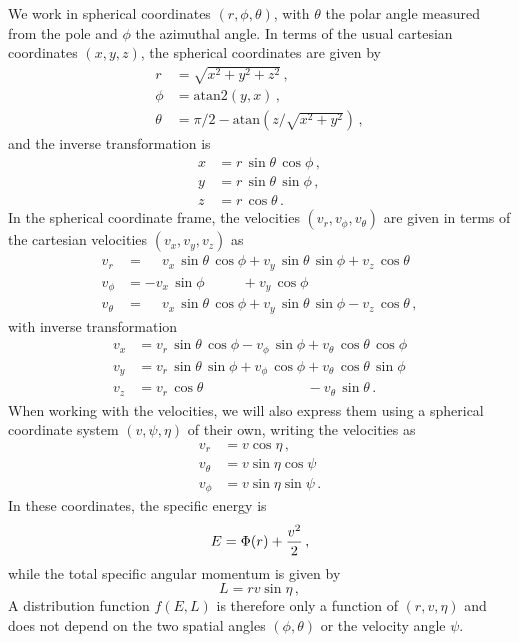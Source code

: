 We work in spherical coordinates $(r,\phi,\theta)$, with $\theta$ the polar angle measured from the pole and $\phi$ the azimuthal angle. In terms of the usual cartesian coordinates $(x,y,z)$, the spherical coordinates are given by
\begin{align}
    \nonumber r       &= \sqrt{x^2 + y^2 + z^2}\,,\\
    \phi    &= \mathrm{atan2}(y,x)\,,\\
    \nonumber \theta  &= \pi/2 - \mathrm{atan}(z/\sqrt{x^2+y^2})\,,
\end{align}
and the inverse transformation is
\begin{align}
    \nonumber x  &= r\,\sin \theta\, \cos \phi\,,\\
    y  &= r\,\sin \theta\, \sin \phi\,,\label{ch2:eq-sphere-coords}\\
    \nonumber z  &= r\,\cos \theta\,.
\end{align}
In the spherical coordinate frame, the velocities  $(v_r,v_\phi,v_\theta)$ are given in terms of the cartesian velocities $(v_x,v_y,v_z)$ as
\begin{align}
    \nonumber v_r & = \phantom{-}v_x\,\sin\theta\,\cos\phi+v_y\,\sin\theta\,\sin\phi+v_z\,\cos\theta\\
    v_\phi & = -v_x\,\sin\phi\phantom{\,\cos\phi}+v_y\,\cos\phi\\
    \nonumber v_\theta & = \phantom{-}v_x\,\sin\theta\,\cos\phi+v_y\,\sin\theta\,\sin\phi-v_z\,\cos\theta\,,
\end{align}
with inverse transformation
\begin{align}
    \nonumber v_x & = v_r\,\sin\theta\,\cos\phi-v_\phi\,\sin \phi+v_\theta\,\cos\theta\,\cos\phi\\
    v_y & = v_r\,\sin\theta\,\sin\phi+v_\phi\,\cos\phi+v_\theta\,\cos\theta\,\sin \phi\label{ch2:eq-vel-spher}\\
    \nonumber v_z & = v_r\,\cos\theta\phantom{\,\sin\phi+v_\phi\,\cos\phi}-v_\theta\,\sin\theta\,.
\end{align}
When working with the velocities, we will also express them using a spherical coordinate system $(v,\psi,\eta)$ of their own, writing the velocities as
\begin{align}
    \nonumber v_{r} & = v \cos\eta\,, \\
     v_{\theta} & = v \sin \eta \cos \psi \label{ch2:eq-sphervels}\\
    \nonumber v_{\phi} & = v \sin \eta \sin \psi\,.
\end{align}
In these coordinates, the specific energy is
\begin{equation}\label{ch2:eq:E-as-v}
    E = \Phi(r) + {v^2 \over 2}\,,
\end{equation}
while the total specific angular momentum is given by
\begin{equation}
    L = rv\sin \eta\,,
\end{equation}
A distribution function $f(E,L)$ is therefore only a function of $(r,v,\eta)$ and does not depend on the two spatial angles $(\phi,\theta)$ or the velocity angle $\psi$.

